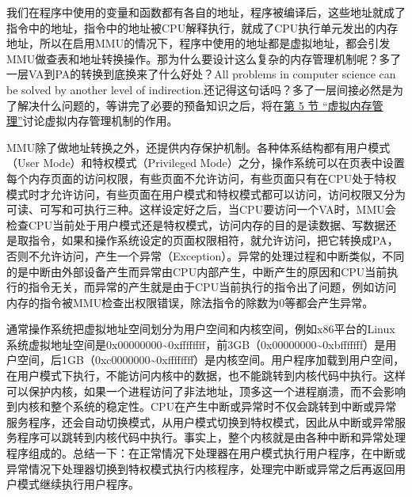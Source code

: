 我们在程序中使用的变量和函数都有各自的地址，程序被编译后，这些地址就成了指令中的地址，指令中的地址被CPU解释执行，就成了CPU执行单元发出的内存地址，所以在启用MMU的情况下，程序中使用的地址都是虚拟地址，都会引发MMU做查表和地址转换操作。那为什么要设计这么复杂的内存管理机制呢？多了一层VA到PA的转换到底换来了什么好处？All problems in computer science can be solved by another level of indirection.\BookSplit{}还记得这句话吗？多了一层间接必然是为了解决什么问题的，等讲完了必要的预备知识之后，将在\hyperlink{db.ch20s05.id2791323}{第 5 节 “虚拟内存管理”}讨论虚拟内存管理机制的作用。



MMU除了做地址转换之外，还提供内存保护机制。各种体系结构都有用户模式（User Mode）和特权模式（Privileged Mode）之分，操作系统可以在页表中设置每个内存页面的访问权限，有些页面不允许访问，有些页面只有在CPU处于特权模式时才允许访问，有些页面在用户模式和特权模式都可以访问，访问权限又分为可读、可写和可执行三种。这样设定好之后，当CPU要访问一个VA时，MMU会检查CPU当前处于用户模式还是特权模式，访问内存的目的是读数据、写数据还是取指令，如果和操作系统设定的页面权限相符，就允许访问，把它转换成PA，否则不允许访问，产生一个异常（Exception）。异常的处理过程和中断类似，不同的是中断由外部设备产生而异常由CPU内部产生，中断产生的原因和CPU当前执行的指令无关，而异常的产生就是由于CPU当前执行的指令出了问题，例如访问内存的指令被MMU检查出权限错误，除法指令的除数为0等都会产生异常。




通常操作系统把虚拟地址空间划分为用户空间和内核空间，例如x86平台的Linux系统虚拟地址空间是0x00000000\textasciitilde{}\BookSplit{}0xffffffff，前3GB（0x00000000\textasciitilde{}\BookSplit{}0xbfffffff）是用户空间，后1GB（0xc0000000\textasciitilde{}\BookSplit{}0xffffffff）是内核空间。用户程序加载到用户空间，在用户模式下执行，不能访问内核中的数据，也不能跳转到内核代码中执行。这样可以保护内核，如果一个进程访问了非法地址，顶多这一个进程崩溃，而不会影响到内核和整个系统的稳定性。CPU在产生中断或异常时不仅会跳转到中断或异常服务程序，还会自动切换模式，从用户模式切换到特权模式，因此从中断或异常服务程序可以跳转到内核代码中执行。事实上，整个内核就是由各种中断和异常处理程序组成的。总结一下：在正常情况下处理器在用户模式执行用户程序，在中断或异常情况下处理器切换到特权模式执行内核程序，处理完中断或异常之后再返回用户模式继续执行用户程序。



